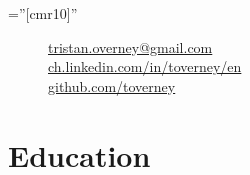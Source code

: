 \documentclass[a4paper,11pt]{article} %
\begin{document}
\pagestyle{empty} %

\font\fb=''[cmr10]'' %



\par{
\bigskip
\par
} %

\begin{figure}
\vspace{-3.5cm}
\footnotesize

\begin{flushright}

\href{mailto:tristan.overney@gmail.com}{tristan.overney@gmail.com} 
\hspace{0.1cm}
\faEnvelope{}
\\ 

\href{https://www.linkedin.com/in/toverney/en}{ch.linkedin.com/in/toverney/en}
\hspace{0.1cm}
\faLinkedin{}
\\

\href{https://github.com/toverney}{github.com/toverney}
\hspace{0.1cm} 
\faGithub{}
\\


\end{flushright}

\end{figure}


\section{Education}
\end{document}
